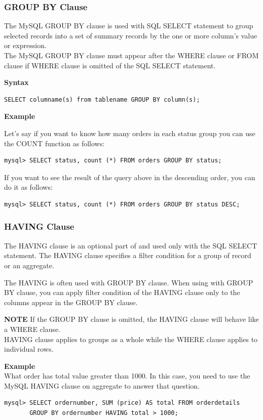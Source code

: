 \documentclass[11pt,a4paper]{article}
\begin{document}
\subsubsection*{GROUP BY Clause}
The MySQL GROUP BY clause is used with SQL SELECT statement to group selected records into a set of summary records by the one or more column's value or expression.\\
The MySQL GROUP BY clause must appear after the WHERE clause or FROM clause if WHERE clause is omitted of the SQL SELECT statement.

\textbf{Syntax}
\begin{verbatim}SELECT columname(s) from tablename GROUP BY column(s);\end{verbatim}

\textbf{Example}

Let's say if you want to know how many orders in each status group you can use the COUNT function as follows:

\begin{verbatim}mysql> SELECT status, count (*) FROM orders GROUP BY status;\end{verbatim}

If you want to see the result of the query above in the descending order, you can do it as follows:

\begin{verbatim}mysql> SELECT status, count (*) FROM orders GROUP BY status DESC;\end{verbatim}

\subsubsection*{HAVING Clause}
The HAVING clause is an optional part of and used only with the SQL SELECT statement. The HAVING clause specifies a filter condition for a group of
record or an aggregate.

The HAVING is often used with GROUP BY clause. When using with GROUP BY clause, you can apply filter condition of the HAVING clause
only to the columns appear in the GROUP BY clause.

\textbf{NOTE}
If the GROUP BY clause is omitted, the HAVING clause will behave like a WHERE clause.\\
HAVING clause applies to groups as a whole while the WHERE clause applies to individual rows.

\textbf{Example}\\
What order has total value greater than 1000. In this case, you need to use the MySQL HAVING clause on aggregate to answer that
question.

\begin{verbatim}
mysql> SELECT ordernumber, SUM (price) AS total FROM orderdetails 
       GROUP BY ordernumber HAVING total > 1000; \end{verbatim}
\end{document}
